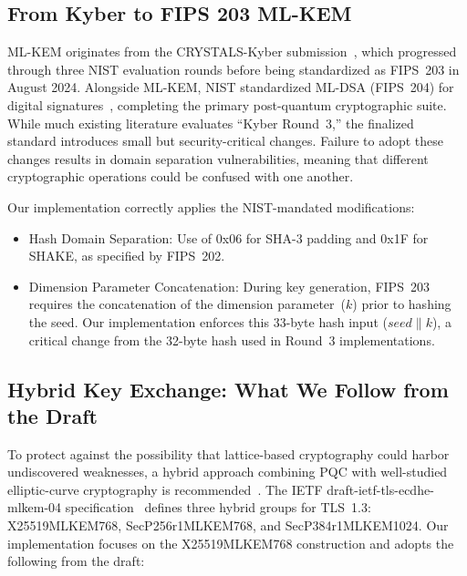 \documentclass[11pt,a4paper]{article}
\def\textbf#1{#1}%
\def\texttt#1{#1}%
\begin{document}
\subsection{From Kyber to FIPS 203 ML-KEM}
\label{subsec:kyber-to-fips203}

ML-KEM originates from the CRYSTALS-Kyber submission~\cite{avanzi2021kyber}, which progressed through three NIST evaluation rounds before being standardized as FIPS~203 in August 2024. Alongside ML-KEM, NIST standardized ML-DSA (FIPS~204) for digital signatures~\cite{NIST-FIPS-204}, completing the primary post-quantum cryptographic suite. While much existing literature evaluates ``Kyber Round~3,'' the finalized standard introduces small but security-critical changes. Failure to adopt these changes results in domain separation vulnerabilities, meaning that different cryptographic operations could be confused with one another.

Our implementation correctly applies the NIST-mandated modifications:
\begin{itemize}
    \item \textbf{Hash Domain Separation:} Use of \texttt{0x06} for SHA-3 padding and \texttt{0x1F} for SHAKE, as specified by FIPS~202.
    \item \textbf{Dimension Parameter Concatenation:} During key generation, FIPS~203 requires the concatenation of the dimension parameter~($k$) prior to hashing the seed. Our implementation enforces this 33-byte hash input ($\textit{seed} \parallel k$), a critical change from the 32-byte hash used in Round~3 implementations.
\end{itemize}

\subsection{Hybrid Key Exchange: What We Follow from the Draft}
\label{subsec:hybrid-kex}

To protect against the possibility that lattice-based cryptography could harbor undiscovered weaknesses, a hybrid approach combining PQC with well-studied elliptic-curve cryptography is recommended~\cite{bindel2019hybrid}. The IETF \texttt{draft-ietf-tls-ecdhe-mlkem-04} specification~\cite{stebila2026ecdheMlkem} defines three hybrid groups for TLS~1.3: X25519MLKEM768, SecP256r1MLKEM768, and SecP384r1MLKEM1024. Our implementation focuses on the X25519MLKEM768 construction and adopts the following from the draft:
\end{document}

